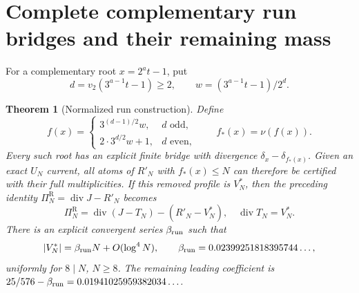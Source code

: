 \documentclass[11pt]{article}
\newtheorem{theorem}{Theorem}
\newcommand{\PiR}{\Pi^{\mathrm R}}
\begin{document}
\section{Complete complementary run bridges and their remaining mass}
For a complementary root $x=2^at-1$, put
\[
d=v_2(3^{a-1}t-1)\ge2,\qquad w=(3^{a-1}t-1)/2^d.
\]
\begin{theorem}[Normalized run construction]\label{thm:runbridge}
Define
\[
f(x)=\begin{cases}
3^{(d-1)/2}w,&d\text{ odd},\\
2\cdot3^{d/2}w+1,&d\text{ even},
\end{cases}
\qquad f_*(x)=\nu(f(x)).
\]
Every such root has an explicit finite bridge with divergence
$\delta_x-\delta_{f_*(x)}$. Given an exact $U_N$ current, all atoms
of $R'_N$ with $f_*(x)\le N$ can therefore be certified with their
full multiplicities. If this removed profile is $V^*_N$, then
the preceding identity $\PiR_N=\operatorname{div}J-R'_N$ becomes
\[
\PiR_N=\operatorname{div}(J-T_N)-(R'_N-V^*_N),
\quad \operatorname{div}T_N=V^*_N.
\]
There is an explicit convergent series $\beta_{\rm run}$ such that
\[
|V^*_N|=\beta_{\rm run}N+O(\log^4N),\qquad
\beta_{\rm run}=0.02399251818395744\ldots,
\]
uniformly for $8\mid N$, $N\ge8$. The remaining leading coefficient is
$25/576-\beta_{\rm run}=0.01941025959382034\ldots$.
\end{theorem}
\end{document}
